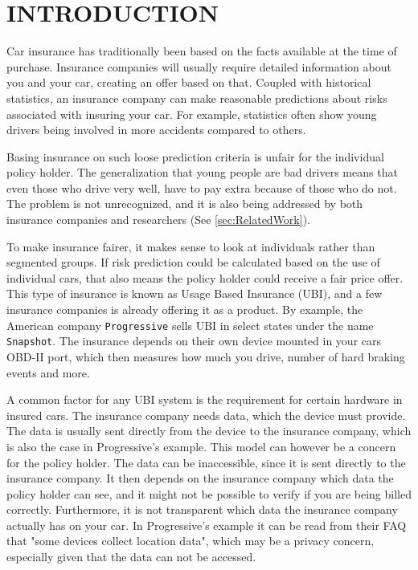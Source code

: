 \section{INTRODUCTION}
\label{sec:intro}

Car insurance has traditionally been based on the facts available at the time of purchase. Insurance companies will usually require detailed information about you and your car, creating an offer based on that. Coupled with historical statistics, an insurance company can make reasonable predictions about risks associated with insuring your car. For example, statistics often show young drivers being involved in more accidents compared to others\cite{accidents}.

Basing insurance on such loose prediction criteria is unfair for the individual policy holder. The generalization that young people are bad drivers means that even those who drive very well, have to pay extra because of those who do not. The problem is not unrecognized, and it is also being addressed by both insurance companies and researchers (See \ref{sec:RelatedWork}).

To make insurance fairer, it makes sense to look at individuals rather than segmented groups. If risk prediction could be calculated based on the use of individual cars, that also means the policy holder could receive a fair price offer. This type of insurance is known as Usage Based Insurance (UBI), and a few insurance companies is already offering it as a product. By example, the American company \texttt{Progressive} sells UBI in select states under the name \texttt{Snapshot}\cite{snapshot}. The insurance depends on their own device mounted in your cars OBD-II port, which then measures how much you drive, number of hard braking events and more.

A common factor for any UBI system is the requirement for certain hardware in insured cars. The insurance company needs data, which the device must provide. The data is usually sent directly from the device to the insurance company, which is also the case in Progressive's example. This model can however be a concern for the policy holder. The data can be inaccessible, since it is sent directly to the insurance company. It then depends on the insurance company which data the policy holder can see, and it might not be possible to verify if you are being billed correctly. Furthermore, it is not transparent which data the insurance company actually has on your car. In Progressive's example it can be read from their FAQ that "some devices collect location data", which may be a privacy concern, especially given that the data can not be accessed.

